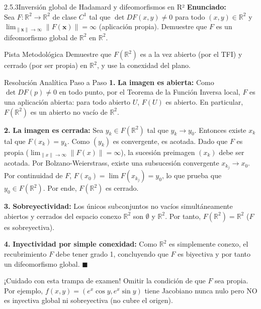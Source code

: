 \documentclass[11pt,a4paper]{article}
\begin{document}
\begin{nivelbox}{2.5.3}{Inversión global de Hadamard y difeomorfismos en R²}
\textbf{Enunciado:}\\
Sea $F: \mathbb{R}^2 \to \mathbb{R}^2$ de clase $C^1$ tal que $\det DF(x,y) \neq 0$ para todo $(x,y) \in \mathbb{R}^2$ y $\lim_{\|\mathbf{x}\| \to \infty} \|F(\mathbf{x})\| = \infty$ (aplicación propia). Demuestre que $F$ es un difeomorfismo global de $\mathbb{R}^2$ en $\mathbb{R}^2$.

\begin{observacionbox}{Pista Metodológica}
Demuestre que $F(\mathbb{R}^2)$ es a la vez abierto (por el TFI) y cerrado (por ser propia) en $\mathbb{R}^2$, y use la conexidad del plano.
\end{observacionbox}

\begin{ejerciciobox}{Resolución Analítica Paso a Paso}
\smallskip\noindent\textbf{1.} \textbf{La imagen es abierta:}
Como $\det DF(p) \neq 0$ en todo punto, por el Teorema de la Función Inversa local, $F$ es una aplicación abierta: para todo abierto $U$, $F(U)$ es abierto. En particular, $F(\mathbb{R}^2)$ es un abierto no vacío de $\mathbb{R}^2$.

\smallskip\noindent\textbf{2.} \textbf{La imagen es cerrada:}
Sea $y_k \in F(\mathbb{R}^2)$ tal que $y_k \to y_0$. Entonces existe $x_k$ tal que $F(x_k) = y_k$. Como $(y_k)$ es convergente, es acotada. Dado que $F$ es propia ($\lim_{\|x\| \to \infty} \|F(x)\| = \infty$), la sucesión preimagen $(x_k)$ debe ser acotada.
Por Bolzano-Weierstrass, existe una subsucesión convergente $x_{k_j} \to x_0$. Por continuidad de $F$, $F(x_0) = \lim F(x_{k_j}) = y_0$, lo que prueba que $y_0 \in F(\mathbb{R}^2)$. Por ende, $F(\mathbb{R}^2)$ es cerrado.

\smallskip\noindent\textbf{3.} \textbf{Sobreyectividad:}
Los únicos subconjuntos no vacíos simultáneamente abiertos y cerrados del espacio conexo $\mathbb{R}^2$ son $\emptyset$ y $\mathbb{R}^2$. Por tanto, $F(\mathbb{R}^2) = \mathbb{R}^2$ ($F$ es sobreyectiva).

\smallskip\noindent\textbf{4.} \textbf{Inyectividad por simple conexidad:}
Como $\mathbb{R}^2$ es simplemente conexo, el recubrimiento $F$ debe tener grado 1, concluyendo que $F$ es biyectiva y por tanto un difeomorfismo global. $\blacksquare$
\end{ejerciciobox}

\begin{errorbox}{¡Cuidado con esta trampa de examen!}
Omitir la condición de que $F$ sea propia. Por ejemplo, $f(x,y) = (e^x\cos y, e^x\sin y)$ tiene Jacobiano nunca nulo pero NO es inyectiva global ni sobreyectiva (no cubre el origen).
\end{errorbox}
\end{nivelbox}
\bigskip
\end{document}
